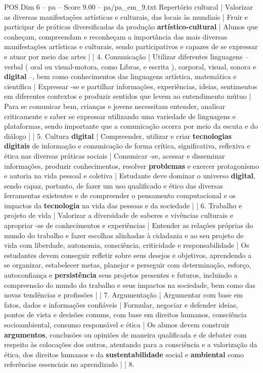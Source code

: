\begin{textsample}{POS Dim 6 – pa – Score 9.00 – pa/pa\_em\_9.txt}
Repertório cultural | Valorizar as diversas manifestações artísticas e culturais, das locais às mundiais | Fruir e participar de práticas diversificadas da produção \textbf{artístico-cultural} | Alunos que conheçam, compreendam e reconheçam a importância das mais diversas manifestações artísticas e culturais, sendo participativos e capazes de se expressar e atuar por meio das artes | | 4.
Comunicação | Utilizar diferentes linguagens – verbal ( oral ou visual-motora, como Libras, e escrita ), corporal, visual, sonora e \textbf{digital} –, bem como conhecimentos das linguagens artística, matemática e científica | Expressar -se e partilhar informações, experiências, ideias, sentimentos em diferentes contextos e produzir sentidos que levem ao entendimento mútuo | Para se comunicar bem, crianças e jovens necessitam entender, analisar criticamente e saber se expressar utilizando uma variedade de linguagens e plataformas, sendo importante que a comunicação ocorra por meio da escuta e do diálogo | | 5.
Cultura \textbf{digital} | Compreender, utilizar e criar \textbf{tecnologias} \textbf{digitais} de informação e comunicação de forma crítica, significativa, reflexiva e ética nas diversas práticas sociais | Comunicar -se, acessar e disseminar informações, produzir conhecimentos, resolver \textbf{problemas} e exercer protagonismo e autoria na vida pessoal e coletiva | Estudante deve dominar o universo \textbf{digital}, sendo capaz, portanto, de fazer um uso qualificado e ético das diversas ferramentas existentes e de compreender o pensamento computacional e os impactos da \textbf{tecnologia} na vida das pessoas e da sociedade | | 6.
Trabalho e projeto de vida | Valorizar a diversidade de saberes e vivências culturais e apropriar -se de conhecimentos e experiências | Entender as relações próprias do mundo do trabalho e fazer escolhas alinhadas à cidadania e ao seu projeto de vida com liberdade, autonomia, consciência, criticidade e responsabilidade | Os estudantes devem conseguir refletir sobre seus desejos e objetivos, aprendendo a se organizar, estabelecer metas, planejar e perseguir com determinação, esforço, autoconfiança e \textbf{persistência} seus projetos presentes e futuros, incluindo a compreensão do mundo do trabalho e seus impactos na sociedade, bem como das novas tendências e profissões | | 7.
Argumentação | Argumentar com base em fatos, dados e informações confiáveis | Formular, negociar e defender ideias, pontos de vista e decisões comuns, com base em direitos humanos, consciência socioambiental, consumo responsável e ética | Os alunos devem construir \textbf{argumentos}, conclusões ou opiniões de maneira qualificada e de debater com respeito às colocações dos outros, atentando para a consciência e a valorização da ética, dos direitos humanos e da \textbf{sustentabilidade} social e \textbf{ambiental} como referências essenciais no aprendizado | | 8.

\end{textsample}
